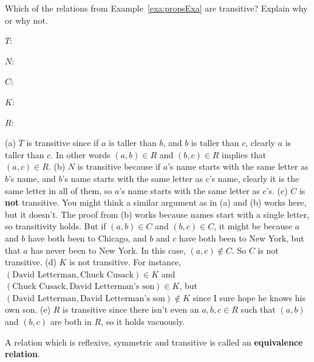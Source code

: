 \begin{exer}
Which of the relations from Example~\ref{exa:propsExa} are transitive?  Explain why or why not.
\begin{lenum}
\item $T$: \blanklinefill  

\blanklinefill
\item $N$: \blanklinefill 

\blanklinefill
\item $C$: \blanklinefill

\blanklinefill
\item $K$: \blanklinefill

\blanklinefill
\item $R$: \blanklinefill

\blanklinefill
\end{lenum}
\begin{answer}
(a) $T$ is transitive since if $a$ is taller than $b$, and $b$ is taller than $c$, clearly $a$ is taller
than $c$.  In other words $(a,b)\in R$ and $(b,c)\in R$ implies that $(a,c)\in R$.
(b) $N$ is transitive because if $a$'s name starts with the same letter as $b$'s name, and
$b$'s name starts with the same letter as $c$'s name, clearly it is the same letter in all of them,
so $a$'s name starts with the same letter as $c$'s.
(c) $C$ is {\bf not} transitive.  You might think a similar argument as in (a) and (b) works here, but
it doesn't.  The proof from (b) works because names start with a single letter, so
transitivity holds.  But if $(a,b)\in C$ and $(b,c)\in C$, it might be because $a$ and $b$ have both
been to Chicago, and $b$ and $c$ have both been to New York, but that $a$ has never been to New York.
In this case, $(a,c)\not\in C$.  So $C$ is not transitive.
(d) $K$ is not transitive.  For instance, $(\mbox{David Letterman},\mbox{Chuck Cusack})\in K$
and $(\mbox{Chuck Cusack},\mbox{David Letterman's son})\in K$, but $(\mbox{David Letterman},\mbox{David Letterman's son})\not\in K$ since I sure hope he knows his own son.
(e) $R$ is transitive since there isn't even an $a,b,c\in R$ such that $(a,b)$ and $(b,c)$ are both in $R$,
so it holds vacuously.
\end{answer}
\end{exer}



\begin{df}
A relation which is reflexive, symmetric and transitive is
called an {\bf equivalence relation}.
\end{df}


